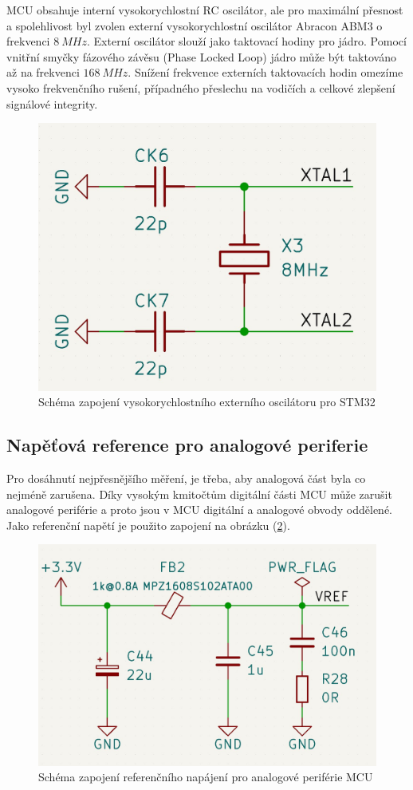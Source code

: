 MCU obsahuje interní vysokorychlostní RC oscilátor, ale pro maximální přesnost a spolehlivost byl zvolen externí vysokorychlostní oscilátor Abracon ABM3 o frekvenci  $8 \ MHz$. Externí oscilátor slouží jako taktovací hodiny pro
jádro.
Pomocí vnitřní smyčky fázového závěsu (Phase Locked Loop) jádro může být taktováno až na frekvenci $168 \ MHz$.
Snížení frekvence externích taktovacích hodin omezíme vysoko frekvenčního rušení, případného přeslechu na vodičích a celkové zlepšení signálové integrity.
\begin{figure}[H]
    \centering
    \includegraphics[width=0.8\linewidth]{pictures/stm32_hse.jpg}
    \caption{Schéma zapojení vysokorychlostního externího oscilátoru pro STM32}
    \label{fig:stm32_hse}
\end{figure}


\pagebreak
\subsection{Napěťová reference pro analogové periferie} \label{section:vref}
Pro dosáhnutí nejpřesnějšího měření, je třeba, aby analogová část byla co nejméně zarušena. Díky vysokým kmitočtům digitální části MCU může zarušit analogové periférie a proto jsou v MCU digitální a analogové obvody oddělené.
Jako referenční napětí je použito zapojení na obrázku (\ref{fig:stm32_vref}).

\begin{figure}[H]
    \centering
    \includegraphics[width=0.9\linewidth]{pictures/stm_analog_reference.jpg}
    \caption{Schéma zapojení referenčního napájení pro analogové periférie MCU}
    \label{fig:stm32_vref}
\end{figure}

